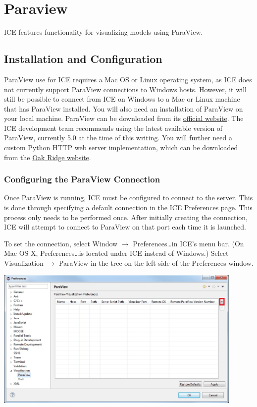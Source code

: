 \chapter{Paraview}

ICE features functionality for visualizing models using ParaView.

\section{Installation and Configuration}

ParaView use for ICE requires a Mac OS or Linux operating system, as ICE does
not currently support ParaView connections to Windows hosts. However, it will
still be possible to connect from ICE on Windows to a Mac or Linux machine
that has ParaView installed. You will also need an installation of ParaView on
your local machine.
ParaView can be downloaded from its \href{http://www.paraview.org/download/}{official website}. The ICE
development team recommends using the latest available version of ParaView,
currently 5.0 at the time of this writing. You will further need a custom
Python HTTP web server implementation, which can be downloaded from the
\href{http://eclipseice.ornl.gov/downloads/paraview/scripts/http_pvw_server.py}{Oak
Ridge website}.

\subsection{Configuring the ParaView Connection}

Once ParaView is running, ICE must be configured to connect to the server. This
is done through specifying a default connection in the ICE Preferences page.
This process only needs to be performed once. After initially creating the
connection, ICE will attempt to connect to ParaView on that port each time it is
launched.

To set the connection, select Window $\rightarrow$ Preferences\ldots in ICE's
menu bar. (On Mac OS X, Preferences\ldots is located under ICE instead of
Windows.) Select Visualization $\rightarrow$ ParaView in the tree on the left
side of the Preferences window.

\begin{center}
\includegraphics[width=12cm]{images/paraviewpreferencepage_ice}
\end{center}

